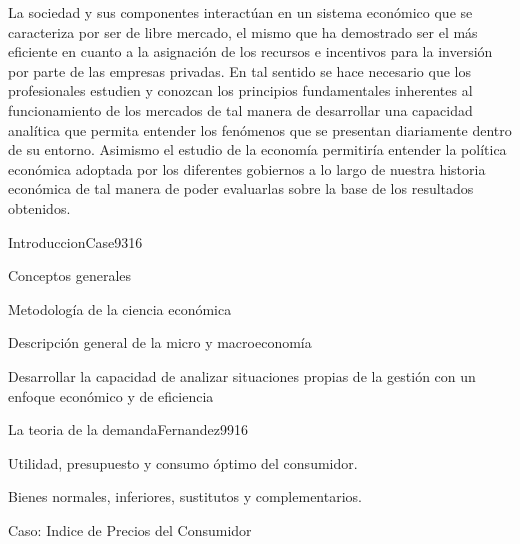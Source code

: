 \begin{syllabus}


\begin{justification}
La sociedad y sus componentes interactúan en un sistema económico que se caracteriza por ser de libre mercado, el mismo que ha demostrado ser el más eficiente en cuanto a la asignación de los recursos e incentivos para la inversión por parte de las empresas privadas. En tal sentido se hace necesario que los profesionales estudien y conozcan los principios fundamentales inherentes al funcionamiento de los mercados de tal manera de desarrollar una capacidad analítica que permita entender los fenómenos que se presentan diariamente dentro de su entorno. Asimismo el estudio de la economía permitiría entender la política económica adoptada por los diferentes gobiernos a lo largo de nuestra historia económica de tal manera de poder evaluarlas sobre la base de los resultados obtenidos.
\end{justification}

\begin{goals}
\item \OutcomeHU
\end{goals}

\begin{outcomes}
\end{outcomes}

\begin{unit}{Introduccion}{Case93}{16}
\begin{topics}
	\item Conceptos generales
	\item Metodología de la ciencia económica
	\item Descripción general de la micro y macroeconomía
\end{topics}

\begin{unitgoals}
      \item Desarrollar la capacidad de analizar situaciones propias de la gestión con un enfoque económico y de eficiencia
   \end{unitgoals}
\end{unit}

\begin{unit}{La teoria de la demanda}{Fernandez99}{16}
\begin{topics}
	\item  Utilidad, presupuesto y consumo óptimo del consumidor.
	\item Bienes normales, inferiores, sustitutos y complementarios.
 	\item Caso: Indice de Precios del Consumidor
\end{topics}


\end{unit}
\end{syllabus}
